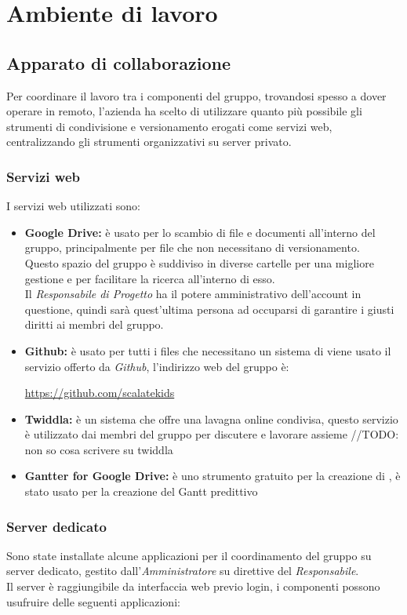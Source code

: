 \documentclass{scalatekids-article}
\begin{document}
\section{Ambiente di lavoro}
\subsection{Apparato di collaborazione}
Per coordinare il lavoro tra i componenti del gruppo, trovandosi spesso a dover
operare in remoto, l'azienda ha scelto di utilizzare quanto più possibile gli
strumenti di condivisione e versionamento erogati come servizi web,
centralizzando gli strumenti organizzativi su server privato.
\subsubsection{Servizi web}
I servizi web utilizzati sono:
\begin{itemize}
\item\textbf{Google Drive:} è usato per lo scambio di file e documenti all'interno del gruppo, principalmente per file che non necessitano di versionamento.\\
  Questo spazio del gruppo è suddiviso in diverse cartelle per una migliore gestione e per facilitare la ricerca all'interno di esso.\\
  Il \textit{Responsabile di Progetto} ha il potere amministrativo dell'account in questione, quindi sarà quest'ultima persona ad occuparsi di garantire i giusti diritti ai membri del gruppo.
\item\textbf{Github:} è usato per tutti i files che necessitano un sistema di  viene usato il servizio offerto da \textit{Github}, l'indirizzo web del gruppo è:\\
  \begin{center}
    \url{https://github.com/scalatekids}
  \end{center}
\item\textbf{Twiddla:} è un sistema che offre una lavagna online condivisa, questo servizio è utilizzato dai membri del gruppo per discutere e lavorare assieme //TODO: non so cosa scrivere su twiddla
\item\textbf{Gantter for Google Drive:} è uno strumento gratuito per la creazione di , è stato usato per la creazione del Gantt predittivo
\end{itemize}
\subsubsection{Server dedicato}
Sono state installate alcune applicazioni per il coordinamento del gruppo su
server dedicato, gestito dall'\textit{Amministratore} su direttive del
\textit{Responsabile}.\\ Il server è raggiungibile da interfaccia web previo
login, i componenti possono usufruire delle seguenti applicazioni:
\end{document}
